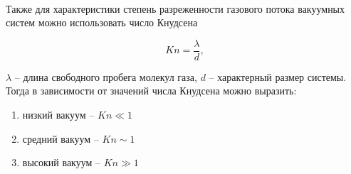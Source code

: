 \documentclass[a4paper,12pt]{article} %
\begin{document}
\paragraph{}
Также для характеристики степень разреженности газового 
потока вакуумных систем можно использовать число Кнудсена
	
	\begin{equation}
		Kn = \frac{\lambda}{d}, 
	\end{equation}

	$\lambda$ -- длина свободного пробега молекул газа, $d$ -- характерный размер системы. \\
	
	Тогда в зависимости от значений числа Кнудсена можно выразить:
\begin{enumerate}
\itemsep0em
\item низкий вакуум -- $Kn \ll 1$
\item средний вакуум -- $Kn \sim 1$
\item высокий вакуум -- $Kn \gg 1$
\end{enumerate}	
\end{document}
